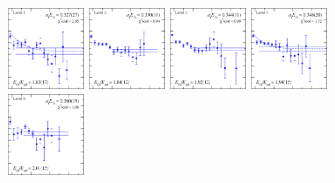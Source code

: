 \begin{figure}[H]
    \includegraphics[width=0.18\textwidth]{figures/sigmas/hg/fits/fit_2.pdf}
    \includegraphics[width=0.18\textwidth]{figures/sigmas/hg/fits/fit_4.pdf}
    \includegraphics[width=0.18\textwidth]{figures/sigmas/hg/fits/fit_6.pdf}
    \includegraphics[width=0.18\textwidth]{figures/sigmas/hg/fits/fit_5.pdf}\\
    \includegraphics[width=0.18\textwidth]{figures/sigmas/hg/fits/fit_1.pdf}

\end{figure}
